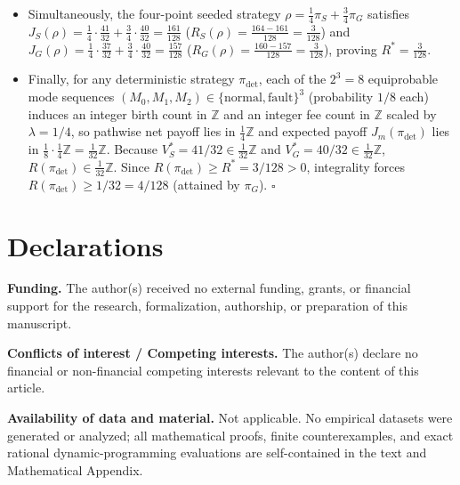 \documentclass[11pt,a4paper]{article}
\begin{document}
\begin{itemize}
  after \((1,1)\). Thus \(V_w^* = \frac{5}{4}\), giving the universal
  minimax lower bound across \emph{all} real-randomized strategies:
  \[R^* \ge L(w) = \frac{3}{4}\cdot\frac{41}{32} + \frac{1}{4}\cdot\frac{40}{32} - \frac{5}{4} = \frac{123 + 40 - 160}{128} = \frac{3}{128}.\]
\item
  Simultaneously, the four-point seeded strategy
  \(\rho = \frac{1}{4}\pi_S + \frac{3}{4}\pi_G\) satisfies
  \(J_S(\rho) = \frac{1}{4}\cdot\frac{41}{32} + \frac{3}{4}\cdot\frac{40}{32} = \frac{161}{128}\)
  (\(R_S(\rho) = \frac{164 - 161}{128} = \frac{3}{128}\)) and
  \(J_G(\rho) = \frac{1}{4}\cdot\frac{37}{32} + \frac{3}{4}\cdot\frac{40}{32} = \frac{157}{128}\)
  (\(R_G(\rho) = \frac{160 - 157}{128} = \frac{3}{128}\)), proving
  \(R^* = \frac{3}{128}\).
\item
  Finally, for any deterministic strategy \(\pi_{\mathrm{det}}\), each
  of the \(2^3 = 8\) equiprobable mode sequences
  \((M_0, M_1, M_2) \in \{\mathrm{normal}, \mathrm{fault}\}^3\)
  (probability \(1/8\) each) induces an integer birth count in
  \(\mathbb{Z}\) and an integer fee count in \(\mathbb{Z}\) scaled by
  \(\lambda = 1/4\), so pathwise net payoff lies in
  \(\frac{1}{4}\mathbb{Z}\) and expected payoff
  \(J_m(\pi_{\mathrm{det}})\) lies in
  \(\frac{1}{8}\cdot\frac{1}{4}\mathbb{Z} = \frac{1}{32}\mathbb{Z}\).
  Because \(V_S^* = 41/32 \in \frac{1}{32}\mathbb{Z}\) and
  \(V_G^* = 40/32 \in \frac{1}{32}\mathbb{Z}\),
  \(R(\pi_{\mathrm{det}}) \in \frac{1}{32}\mathbb{Z}\). Since
  \(R(\pi_{\mathrm{det}}) \ge R^* = 3/128 > 0\), integrality forces
  \(R(\pi_{\mathrm{det}}) \ge 1/32 = 4/128\) (attained by \(\pi_G\)).
  \(\square\)
\end{itemize}

\section*{Declarations}\label{declarations}

\textbf{Funding.} The author(s) received no external funding, grants, or
financial support for the research, formalization, authorship, or
preparation of this manuscript.

\textbf{Conflicts of interest / Competing interests.} The author(s)
declare no financial or non-financial competing interests relevant to
the content of this article.

\textbf{Availability of data and material.} Not applicable. No empirical
datasets were generated or analyzed; all mathematical proofs, finite
counterexamples, and exact rational dynamic-programming evaluations are
self-contained in the text and Mathematical Appendix.
\end{document}
